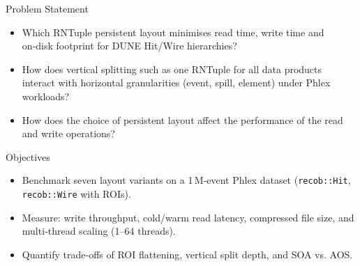 \documentclass[aspectratio=169]{beamer}
\begin{document}
\begin{frame}{Problem Statement}
  \begin{itemize}
    \item Which RNTuple persistent layout minimises read time, write time and on‑disk footprint for DUNE Hit/Wire hierarchies?
    
    \vspace{2em}

    \item How does vertical splitting such as one RNTuple for all data products interact with horizontal granularities (event, spill, element) under Phlex workloads?

    \vspace{2em}

    \item How does the choice of persistent layout affect the performance of the read and write operations?
  \end{itemize}
\end{frame}

\begin{frame}{Objectives}
  \begin{itemize}
    \item Benchmark seven layout variants on a 1\,M‑event Phlex dataset (\texttt{recob::Hit}, \texttt{recob::Wire} with ROIs).
    
    \vspace{2em}

    \item Measure: write throughput, cold/warm read latency, compressed file size, and multi‑thread scaling (1--64 threads).

    \vspace{2em}

    \item Quantify trade‑offs of ROI flattening, vertical split depth, and SOA vs. AOS.
  \end{itemize}
\end{frame}

\end{document}
